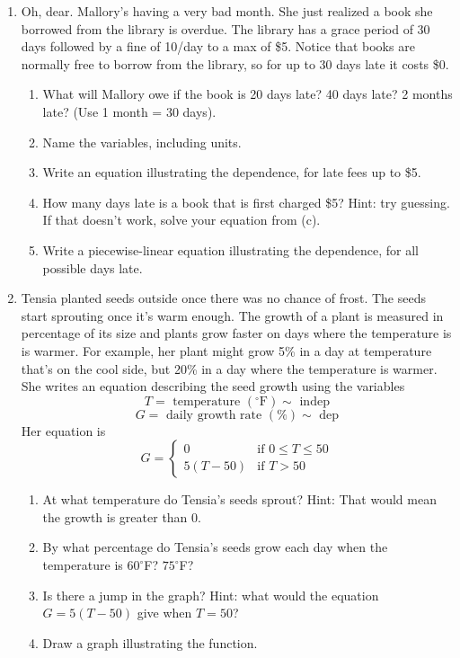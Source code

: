 \begin{enumerate}
\item Oh, dear.  Mallory's having a very bad month.  She just realized a book she borrowed from the library is overdue.  The library has a grace period of 30 days followed by a fine of 10\textcent/day to a max of \$5. Notice that books are normally free to borrow from the library, so for up to 30 days late it costs \$0.
\begin{enumerate}    
    \item What will Mallory owe if the book is 20 days late?  40 days late?  2 months late? (Use 1 month = 30 days).
    \item Name the variables, including units.
    \item Write an equation illustrating the dependence, for late fees up to \$5.
    \item How many days late is a book that is first charged \$5?  Hint: try guessing.  If that doesn't work, solve your equation from (c).
    \item Write a piecewise-linear equation illustrating the dependence, for all possible days late.
\end{enumerate}


\item Tensia planted seeds outside once there was no chance of frost.  The seeds start sprouting once it's warm enough. The growth of a plant is measured in percentage of its size and plants grow faster on days where the temperature is is warmer.   For example, her plant might grow 5\% in a day at temperature that's on the cool side, but 20\% in a day where the temperature is warmer. She writes an equation describing the seed growth using the variables
$$T = \text{ temperature } (^\circ\text{F}) \sim \text{ indep}$$
$$G = \text{ daily growth rate } (\%) \sim \text{ dep}$$
Her equation is
$$G = \left\{
        \begin{array}{cl}
            0 & \text{if } 0 \le T \le 50 \\
            5(T-50) & \text{if } T>50
        \end{array}
    \right.$$
\begin{enumerate}
    \item At what temperature do Tensia's seeds sprout?  Hint: That would mean the growth is greater than 0.
    \item By what percentage do Tensia's seeds grow each day when the temperature is $60^\circ$F?  $75^\circ$F?
    \item Is there a jump in the graph?  Hint: what would the equation $G=5(T-50)$ give when $T=50$?
    \item Draw a graph illustrating the function.
\end{enumerate}


\end{enumerate}
